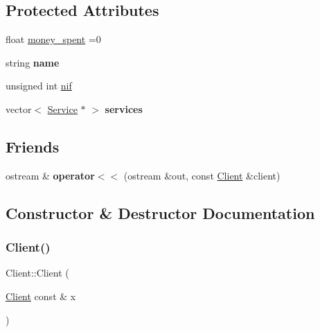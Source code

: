 \subsection*{Protected Attributes}
\begin{DoxyCompactItemize}
\item 
float \hyperlink{class_client_a9d5dc70a6eee2fded8217a7983fe5fd0}{money\+\_\+spent} =0
\item 
\mbox{\label{class_client_a456e36f9972a8bf3ecdb5f0e70b3bd5d}} 
string {\bfseries name}
\item 
unsigned int \hyperlink{class_client_a1c94dc96a56cb5032573fb1d528517c2}{nif}
\item 
\mbox{\label{class_client_a02b601f12b9905edae7e64ded9bde912}} 
vector$<$ \hyperlink{class_service}{Service} $\ast$ $>$ {\bfseries services}
\end{DoxyCompactItemize}
\subsection*{Friends}
\begin{DoxyCompactItemize}
\item 
\mbox{\label{class_client_a001b1071dc56da194d697f845bbc4b1b}} 
ostream \& {\bfseries operator$<$$<$} (ostream \&out, const \hyperlink{class_client}{Client} \&client)
\end{DoxyCompactItemize}


\subsection{Constructor \& Destructor Documentation}
\mbox{\label{class_client_ab3079953a67493b5da6ffb32d4f14ac7}} 
\subsubsection{\texorpdfstring{Client()}{Client()}\hspace{0.1cm}{\footnotesize\ttfamily [1/3]}}
{\footnotesize\ttfamily Client\+::\+Client (\begin{DoxyParamCaption}\item[{\hyperlink{class_client}{Client} const \&}]{x }\end{DoxyParamCaption})}

